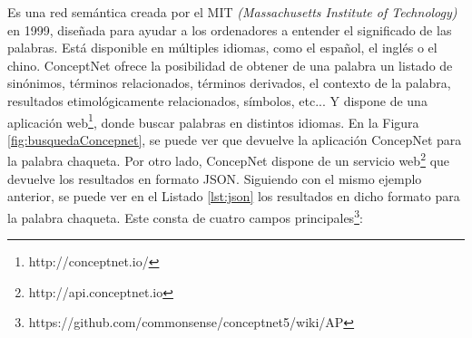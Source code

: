 Es una red semántica creada por el MIT \textit{(Massachusetts Institute of Technology)} en 1999, diseñada para ayudar a los ordenadores a entender el significado de las palabras. Está disponible en múltiples idiomas, como el español, el inglés o el chino. ConceptNet ofrece la posibilidad de obtener de una palabra un listado de sinónimos, términos relacionados, términos derivados, el contexto de la palabra, resultados etimológicamente relacionados, símbolos, etc... Y dispone de una aplicación web\footnote{http://conceptnet.io/}, donde  buscar palabras en distintos idiomas. En la Figura  \ref{fig:busquedaConcepnet}, se puede ver que  devuelve la aplicación ConcepNet para la palabra chaqueta.
Por otro lado, ConcepNet dispone de un servicio web\footnote{http://api.conceptnet.io} que devuelve los resultados en formato JSON. Siguiendo con el mismo ejemplo anterior, se puede ver en el Listado \ref{lst:json} los resultados en dicho formato para la palabra chaqueta. Este consta de cuatro campos principales\footnote{https://github.com/commonsense/conceptnet5/wiki/AP}:
